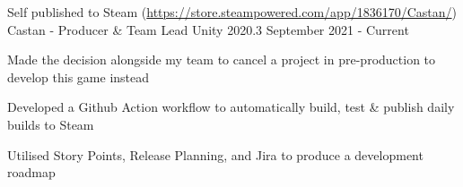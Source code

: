 

\begin{cventries}

    \cventry
    {Self published to Steam (\href{https://store.steampowered.com/app/1836170/Castan/}{https://store.steampowered.com/app/1836170/Castan/})}
    {Castan - Producer \& Team Lead}
    {Unity 2020.3}
    {September 2021 - Current}
    {
        \begin{cvitems}
            \item Made the decision alongside my team to cancel a project in pre-production to develop this game instead
            \item Developed a Github Action workflow to automatically build, test \& publish daily builds to Steam
            \item Utilised Story Points, Release Planning, and Jira to produce a development roadmap
        \end{cvitems}  
    }



\end{cventries}
